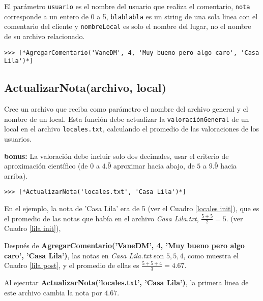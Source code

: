 El parámetro \texttt{usuario} es el nombre del usuario que realiza el comentario, \texttt{nota} corresponde a un entero de 0 a 5, \texttt{blablabla} es un string de una sola linea con el comentario del cliente y \texttt{nombreLocal} es solo el nombre del lugar, no el nombre de su archivo relacionado. 

\begin{lstlisting}[style = consola]
>>> [*AgregarComentario('VaneDM', 4, 'Muy bueno pero algo caro', 'Casa Lila')*]

\end{lstlisting}

\begin{center}
    \fbox{
    \lstset{ breaklines=true, basicstyle=\footnotesize }
    
    }
    \label{lila post}
\end{center}


\subsection{ActualizarNota(archivo, local)}

Cree un archivo que reciba como parámetro el nombre del archivo general y el nombre de un local. Esta función debe actualizar la \texttt{valoraciónGeneral} de un local en el archivo \texttt{locales.txt}, calculando el promedio de las valoraciones de los usuarios.

\textbf{bonus:} La valoración debe incluir solo dos decimales, usar el criterio de aproximación científico (de $0$ a $4.\bar{9}$ aproximar hacia abajo, de $5$ a $9.\bar{9}$ hacia arriba).

\begin{lstlisting}[style = consola]
>>> [*ActualizarNota('locales.txt', 'Casa Lila')*]
\end{lstlisting}

\begin{center}
    \fbox{
    \lstset{ breaklines=true, basicstyle=\footnotesize }
    
    }
    \label{locales post}
\end{center}

En el ejemplo, la nota de 'Casa Lila' era de 5 (ver el Cuadro \ref{locales init}), que es el promedio de las notas que había en el archivo \textit{Casa Lila.txt}, $\frac{5+5}{2} = 5$. (ver Cuadro \ref{lila init}), 

Después de \textbf{AgregarComentario('VaneDM', 4, 'Muy bueno pero algo caro', 'Casa Lila')}, las notas en \textit{Casa Lila.txt} son $5,5,4$, como muestra el Cuadro \ref{lila post}, y el promedio de ellas es $\frac{5+5+4}{3}=4.67$.

Al ejecutar \textbf{ActualizarNota('locales.txt', 'Casa Lila')}, la primera linea de este archivo cambia la nota por $4.67$.

